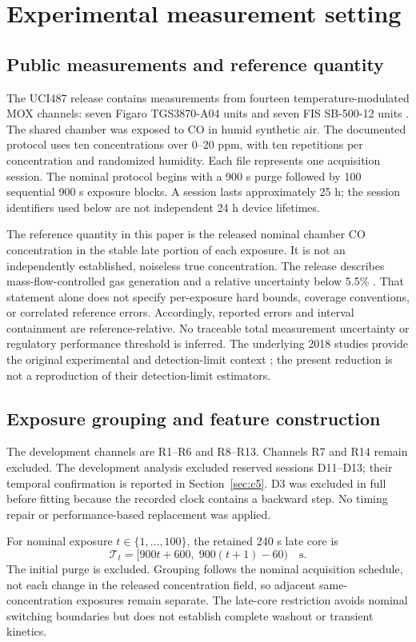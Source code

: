 \section{Experimental measurement setting}\label{sec:setting}
\subsection{Public measurements and reference quantity}
The UCI487 release contains measurements from fourteen temperature-modulated MOX channels: seven Figaro TGS3870-A04 units and seven FIS SB-500-12 units \cite{uci487}. The shared chamber was exposed to CO in humid synthetic air. The documented protocol uses ten concentrations over 0--20 ppm, with ten repetitions per concentration and randomized humidity. Each file represents one acquisition session. The nominal protocol begins with a 900 s purge followed by 100 sequential 900 s exposure blocks. A session lasts approximately 25 h; the session identifiers used below are not independent 24 h device lifetimes.

The reference quantity in this paper is the released nominal chamber CO concentration in the stable late portion of each exposure. It is not an independently established, noiseless true concentration. The release describes mass-flow-controlled gas generation and a relative uncertainty below 5.5\% \cite{uci487}. That statement alone does not specify per-exposure hard bounds, coverage conventions, or correlated reference errors. Accordingly, reported errors and interval containment are reference-relative. No traceable total measurement uncertainty or regulatory performance threshold is inferred. The underlying 2018 studies provide the original experimental and detection-limit context \cite{burgues2018linear,burgues2018opls}; the present reduction is not a reproduction of their detection-limit estimators.

\subsection{Exposure grouping and feature construction}
The development channels are R1--R6 and R8--R13. Channels R7 and R14 remain excluded. The development analysis excluded reserved sessions D11--D13; their temporal confirmation is reported in Section~\ref{sec:c5}. D3 was excluded in full before fitting because the recorded clock contains a backward step. No timing repair or performance-based replacement was applied.

For nominal exposure $t\in\{1,\ldots,100\}$, the retained 240 s late core is
\begin{equation}
\mathcal{T}_t=[900t+600,\;900(t+1)-60)\quad\mathrm{s}.
\label{eq:core}
\end{equation}
The initial purge is excluded. Grouping follows the nominal acquisition schedule, not each change in the released concentration field, so adjacent same-concentration exposures remain separate. The late-core restriction avoids nominal switching boundaries but does not establish complete washout or transient kinetics.

